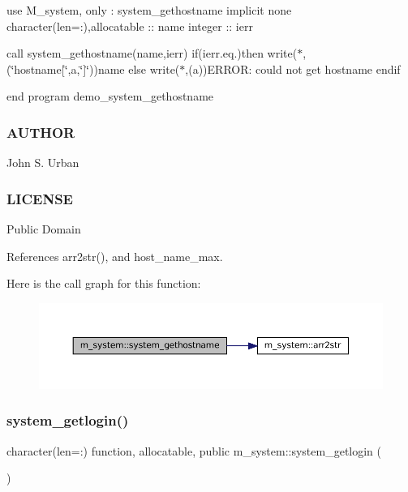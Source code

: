 use M\+\_\+system, only \+: system\+\_\+gethostname implicit none character(len=\+:),allocatable \+:\+: name integer \+:\+: ierr

call system\+\_\+gethostname(name,ierr) if(ierr.\+eq.)then write($\ast$,\textquotesingle{}(\char`\"{}hostname\mbox{[}\char`\"{},a,\char`\"{}\mbox{]}\char`\"{})\textquotesingle{})name else write($\ast$,\textquotesingle{}(a)\textquotesingle{})\textquotesingle{}E\+R\+R\+OR\+: could not get hostname\textquotesingle{} endif

end program demo\+\_\+system\+\_\+gethostname

\subsubsection*{A\+U\+T\+H\+OR}

John S. Urban \subsubsection*{L\+I\+C\+E\+N\+SE}

Public Domain 

References arr2str(), and host\+\_\+name\+\_\+max.

Here is the call graph for this function\+:
\nopagebreak
\begin{figure}[H]
\begin{center}
\leavevmode
\includegraphics[width=350pt]{namespacem__system_a96fab225737afb77ff1cbba9866f0d05_cgraph}
\end{center}
\end{figure}
\mbox{\label{namespacem__system_a70f78645a1f130734005e190d469529d}} 
\subsubsection{\texorpdfstring{system\+\_\+getlogin()}{system\_getlogin()}}
{\footnotesize\ttfamily character(len=\+:) function, allocatable, public m\+\_\+system\+::system\+\_\+getlogin (\begin{DoxyParamCaption}{ }\end{DoxyParamCaption})}



